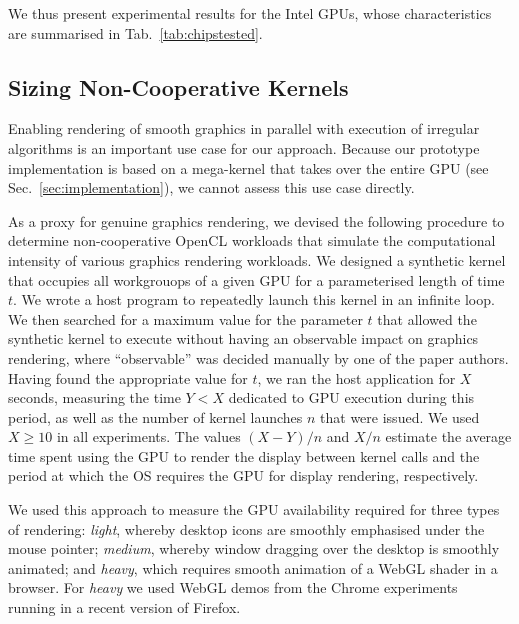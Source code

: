 \documentclass[numbers,nocopyrightspace,10pt]{sigplanconf}
\newcommand{\mytab}{Tab.~}
\newcommand{\mysec}{Sec.~}
\begin{document}
We thus present experimental results for the Intel GPUs, whose characteristics are summarised in \mytab\ref{tab:chipstested}.


\subsection{Sizing Non-Cooperative Kernels}\label{sec:sizingnoncoop}

Enabling rendering of smooth graphics in parallel with execution of irregular algorithms is an important use case for our approach.  Because our prototype implementation is based on a mega-kernel that takes over the entire GPU (see \mysec\ref{sec:implementation}), we cannot assess this use case directly.

As a proxy for genuine graphics rendering, we devised the following
procedure to determine non-cooperative OpenCL workloads that simulate
the computational intensity of various graphics rendering workloads.
%
We designed a synthetic kernel that occupies all workgrouops of a
given GPU for a parameterised length of time $t$.  We wrote a host
program to repeatedly launch this kernel in an infinite loop.  We then
searched for a maximum value for the parameter $t$ that allowed the
synthetic kernel to execute without having an observable impact on
graphics rendering, where ``observable'' was decided manually by one
of the paper authors.  Having found the appropriate value for $t$, we
ran the host application for $X$ seconds, measuring the time $Y < X$
dedicated to GPU execution during this period, as well as the number
of kernel launches $n$ that were issued.  We used $X \geq 10$ in all
experiments.  The values $(X-Y)/n$ and $X/n$ estimate the average time
spent using the GPU to render the display between kernel calls and the
period at which the OS requires the GPU for display rendering,
respectively.

We used this approach to measure the GPU availability required for three
types of rendering: \emph{light}, whereby desktop icons are smoothly
emphasised under the mouse pointer; \emph{medium}, whereby window
dragging over the desktop is smoothly animated; and \emph{heavy}, which
requires smooth animation of a WebGL shader in a browser.  For
\emph{heavy} we used WebGL demos from the Chrome
experiments~\cite{chrome-experiments} running
in a recent version of Firefox.

\end{document}
